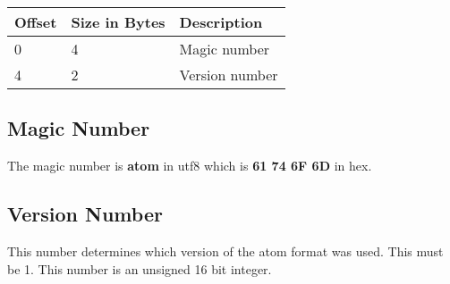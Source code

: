 \begin{table}[h]
    \centering
    \label{tbl:header}
    \begin{tabular}{|l|l|l|}
        \hline
        \textbf{Offset} & \textbf{Size in Bytes} & \textbf{Description} \\ \hline
        0               & 4                      & Magic number         \\ \hline
        4               & 2                      & Version number       \\ \hline
    \end{tabular}
\end{table}

\subsection{Magic Number}
The magic number is \textbf{atom} in utf8 which is \textbf{61 74 6F 6D} in hex.

\subsection{Version Number}
This number determines which version of the atom format was used. This must be 
1. This number is an unsigned 16 bit integer.